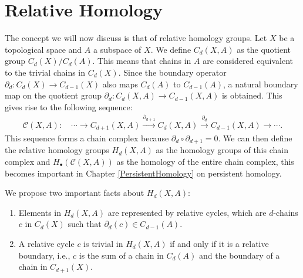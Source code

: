 \section{Relative Homology}
\label{RelativeHomology}
The concept we will now discuss is that of relative homology groups. Let \( X \) be a topological space and \( A \) a subspace of \( X \). We define \( C_{d}(X, A) \) as the quotient group \( C_{d}(X) / C_{d}(A) \). This means that chains in \( A \) are considered equivalent to the trivial chains in \( C_{d}(X) \). Since the boundary operator \( \partial_{d}: C_{d}(X) \rightarrow C_{d-1}(X) \) also maps \( C_{d}(A) \) to \( C_{d-1}(A) \), a natural boundary map on the quotient group \( \partial_{d}: C_{d}(X, A) \rightarrow C_{d-1}(X, A) \) is obtained. This gives rise to the following sequence:
\begin{align}
	\mathcal{C}(X,A): \quad \cdots \rightarrow C_{d+1}(X, A) \xrightarrow{\partial_{d+1}} C_{d}(X, A) \xrightarrow{\partial_{d}} C_{d-1}(X, A) \rightarrow \cdots. 
\end{align}
This sequence forms a chain complex because \( \partial_{d} \circ \partial_{d+1} = 0 \). We can then define the relative homology groups \( H_{d}(X, A)\) as the homology groups of this chain complex and $H_\bullet(\mathcal{C}(X,A))$ as the homology of the entire chain complex, this becomes important in Chapter \ref{PersistentHomology} on persistent homology.

We propose two important facts about \( H_{d}(X, A) \):

\begin{proposition}{\cite[\S 2.1, p.115]{hatcher2005algebraic}}
	\begin{enumerate}
		\item Elements in \( H_{d}(X, A) \) are represented by relative cycles, which are \( d \)-chains \( c \) in \( C_{d}(X) \) such that \( \partial_{d}(c) \in C_{d-1}(A) \).
		\item A relative cycle \( c \) is trivial in \( H_{d}(X, A) \) if and only if it is a relative boundary, i.e., \( c \) is the sum of a chain in \( C_{d}(A) \) and the boundary of a chain in \( C_{d+1}(X) \).
	\end{enumerate}
\end{proposition}

